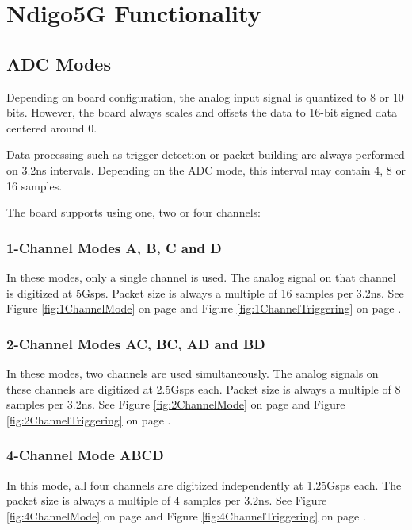 \section{Ndigo5G Functionality}
\subsection{ADC Modes}

Depending on board configuration, the analog input signal is quantized to 8 or 10 bits. However, the board always scales and offsets the data to 16-bit signed data centered around 0.\par
Data processing such as trigger detection or packet building are always performed on 3.2ns intervals. Depending on the ADC mode, this interval may contain 4, 8 or 16 samples.\par
The board supports using one, two or four channels:

\subsubsection{1-Channel Modes A, B, C and D}

In these modes, only a single channel is used. The analog signal on that channel is digitized at 5Gsps. Packet size is always a multiple of 16 samples per 3.2ns. See Figure \ref{fig:1ChannelMode} on page \pageref{fig:1ChannelMode} and Figure \ref{fig:1ChannelTriggering} on page \pageref{fig:1ChannelTriggering}.

\subsubsection{2-Channel Modes AC, BC, AD and BD}

In these modes, two channels are used simultaneously. The analog signals on these channels are digitized at 2.5Gsps each. Packet size is always a multiple of 8 samples per 3.2ns. See Figure \ref{fig:2ChannelMode} on page \pageref{fig:2ChannelMode} and Figure \ref{fig:2ChannelTriggering} on page \pageref{fig:2ChannelTriggering}.

\subsubsection{4-Channel Mode ABCD}

In this mode, all four channels are digitized independently at 1.25Gsps each. The packet size is always a multiple of 4 samples per 3.2ns. See Figure \ref{fig:4ChannelMode} on page \pageref{fig:4ChannelMode} and Figure \ref{fig:4ChannelTriggering} on page \pageref{fig:4ChannelTriggering}.

